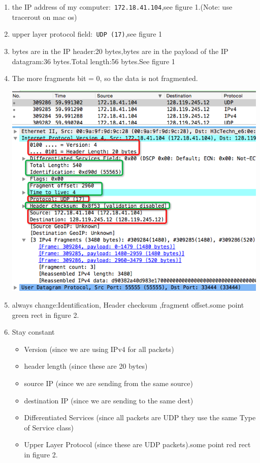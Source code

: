 \documentclass[a4paper]{article}
\begin{document}
{	\begin{enumerate}
	\item the IP address of my computer:\verb| 172.18.41.104|,see figure 1.(Note: use tracerout on mac os)
	\item upper layer protocol field:\verb| UDP (17)|,see figure 1
	\item bytes are in the IP header:20 bytes,bytes are in the payload of the IP datagram:36 bytes.Total length:56 bytes.See figure 1
	\item The more fragments bit = 0, so the data is not fragmented.
	\begin{center} \includegraphics[scale=0.5]{Illustrations/2.png} \end{center}
	\item always change:Identification, Header checksum ,fragment offset.some point green rect in figure 2.
	\item Stay constant
		\begin{itemize}
			\item Version (since we are using IPv4 for all packets)
			\item header length (since these are 20 bytes)
			\item source IP (since we are sending from the same source)
			\item destination IP (since we are sending to the same dest)
			\item Differentiated Services (since all packets are UDP they use the same Type of Service class)
			\item Upper Layer Protocol (since these are UDP packets).some point red rect in figure 2.

\end{itemize}
\end{enumerate}}
\end{document}
